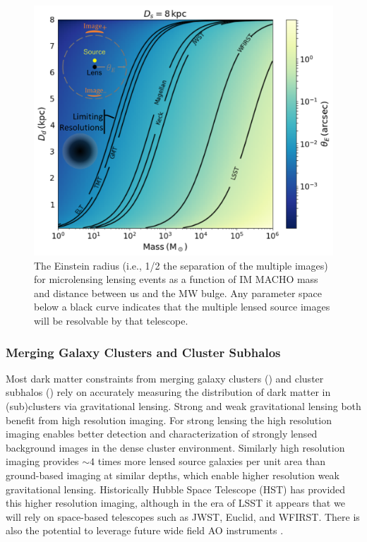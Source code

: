\begin{figure}
\label{fig:strong_microlensing}
\centering
\includegraphics[width=0.6\columnwidth]{figures/StrongMicrolensing.png}
\caption{The Einstein radius (i.e., 1/2 the separation of the multiple images) for microlensing lensing events as a function of IM MACHO mass and distance between us and the MW bulge. Any parameter space below a black curve indicates that the multiple lensed source images will be resolvable by that telescope. }
\end{figure}

\subsubsection{Merging Galaxy Clusters and Cluster Subhalos}

Most dark matter constraints from merging galaxy clusters () and cluster subhalos () rely on accurately measuring the distribution of dark matter in (sub)clusters via gravitational lensing.
Strong and weak gravitational lensing both benefit from high resolution imaging.
For strong lensing the high resolution imaging enables better detection and characterization of strongly lensed background images in the dense cluster environment.
Similarly high resolution imaging provides $\sim4$ times more lensed source galaxies per unit area than ground-based imaging at similar depths, which enable higher resolution weak gravitational lensing.
Historically Hubble Space Telescope (HST) has provided this higher resolution imaging, although in the era of LSST it appears that we will rely on space-based telescopes such as JWST, Euclid, and WFIRST.
There is also the potential to leverage future wide field AO instruments .

